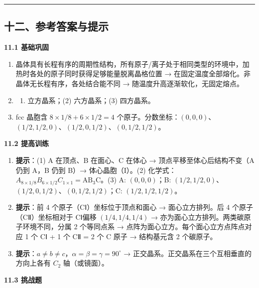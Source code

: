 \documentclass[a4paper,11pt]{ctexart}
\providecommand{\tightlist}{\setlength{\itemsep}{0pt}\setlength{\parskip}{0pt}}
\begin{document}
\begin{center}\rule{0.5\linewidth}{0.5pt}\end{center}

\subsection{十二、参考答案与提示}\label{ux5341ux4e8cux53c2ux8003ux7b54ux6848ux4e0eux63d0ux793a}

\textbf{11.1 基础巩固}

\begin{enumerate}
\def\labelenumi{\arabic{enumi}.}
\item
  晶体具有长程有序的周期性结构，所有原子/离子处于相同类型的环境中，加热时各处的原子同时获得足够能量脱离晶格位置 → 在固定温度全部熔化。非晶体无长程有序，各处结合能不同 → 随温度升高逐渐软化，无固定熔点。
\item
  \begin{enumerate}
  \def\labelenumii{(\arabic{enumii})}
  \tightlist
  \item
    立方晶系；(2) 六方晶系；(3) 四方晶系。
  \end{enumerate}
\item
  fcc 晶胞含 \(8 \times 1/8 + 6 \times 1/2 = 4\) 个原子。分数坐标：\((0, 0, 0)\)、\((1/2, 1/2, 0)\)、\((1/2, 0, 1/2)\)、\((0, 1/2, 1/2)\)。
\end{enumerate}

\textbf{11.2 提高训练}

\begin{enumerate}
\def\labelenumi{\arabic{enumi}.}
\setcounter{enumi}{3}
\item
  \textbf{提示}：(1) A 在顶点、B 在面心、C 在体心 → 顶点平移至体心后结构不变（A 仍到 A，B 仍到 B）→ 体心晶胞（I）。(2) 化学式：\(A_{8\times 1/8} B_{6\times 1/2} C_{1\times 1} = \mathrm{AB_3C}\)。(3) A: \((0,0,0)\)；B: \((1/2,1/2,0)\)、\((1/2,0,1/2)\)、\((0,1/2,1/2)\)；C: \((1/2,1/2,1/2)\)。
\item
  \textbf{提示}：前 4 个原子（CⅠ）坐标位于顶点和面心 → 面心立方排列。后 4 个原子（CⅡ）坐标相对于 CⅠ偏移 \((1/4, 1/4, 1/4)\) → 亦为面心立方排列。两类碳原子环境不同，分属 2 个等同点系 → 点阵为面心立方。每个面心立方点阵点对应 1 个 CⅠ + 1 个 CⅡ = 2 个 C 原子 → 结构基元含 2 个碳原子。
\item
  \textbf{提示}：\(a \neq b \neq c\)，\(\alpha = \beta = \gamma = 90^\circ\) → 正交晶系。正交晶系在三个互相垂直的方向上各有 \(C_2\) 轴（或镜面）。
\end{enumerate}

\textbf{11.3 挑战题}
\end{document}
